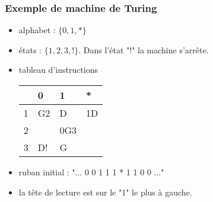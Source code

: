 \begin{frame}
  \frametitle{Exemple de machine de Turing}
  \begin{itemize}
    \item alphabet : $\{0,1,*\}$
    \item états : $\{1, 2, 3, !\}$. Dans l'état "!" la machine s'arrête.
    \item tableau d'instructions
\begin{center}    
\renewcommand{\arraystretch}{1.5}
\begin{tabular}{|l|l|l|l|} \hline
  & 0  & 1   & *  \\ \hline
1 & G2 & D   & 1D \\ \hline
2 &    & 0G3 &    \\ \hline
3 & D! & G   &    \\ \hline
\end{tabular}
\end{center}
    \item ruban initial : "... 0 0 1 1 1 * 1 1 0 0 ..."
    \item la tête de lecture est sur le "1" le plus à gauche.
  \end{itemize}
\end{frame}

